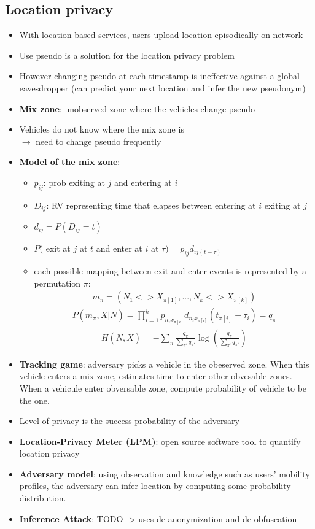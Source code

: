 \subsection{Location privacy}
\begin{itemize}
	\item With location-based services, users upload location episodically on network
	\item Use pseudo is a solution for the location privacy problem
	\item However changing pseudo at each timestamp is ineffective against a global eavesdropper (can predict your next location and infer the new pseudonym)
	\item \textbf{Mix zone}: unobserved zone where the vehicles change  pseudo 
	\item Vehicles do not know where the mix zone is \\
	$\rightarrow$ need to change pseudo frequently
	\item \textbf{Model of the mix zone}:
	\begin{itemize}
		\item $p_{ij}$: prob exiting at $j$ and entering at $i$
		\item $D_{ij}$: RV representing time that elapses between entering at $i$ exiting at $j$
		\item $d_{ij} = P(D_{ij} = t)$
		\item $P($ exit at $j$ at $t$ and enter at $i$ at $\tau) = p_{ij} d_{ij(t - \tau)}$
		\item each possible mapping between exit and enter events is represented by a permutation $\pi$:
		\begin{align*}
			m_{\pi} = (N_1 <> X_{\pi[1]}, ..., N_k <> X_{\pi[k]})
		\end{align*}
		\begin{align*}
			P(m_{\pi}, \bar{X} | \bar{N}) = \prod_{i=1}^k p_{n_i x_{\pi[i]}} d_{n_i x_{\pi[i]}} (t_{\pi[i]} - \tau_i) = q_{\pi}
		\end{align*}
		\begin{align*}
			H(\bar{N}, \bar{X}) = -\sum_{\pi} \frac{q_{\pi}}{\sum_{\pi'} q_{\pi'}} \log 
				\left( 
					\frac{q_{\pi}}{\sum_{\pi'} q_{\pi'}}
				\right)
		\end{align*}
	\end{itemize}
	\item \textbf{Tracking game}: adversary picks a vehicle in the obeserved zone. When this vehicle enters a mix zone, estimates time to enter other obvesable zones. When a vehicule enter obversable zone, compute probability of vehicle to be the one.
	\item Level of privacy is the success probability of the adversary
	\item \textbf{Location-Privacy Meter (LPM)}: open source software tool to quantify location privacy
	\item \textbf{Adversary model}: using observation and knowledge such as users' mobility profiles, the adversary can infer location by computing some probability distribution.
	\item \textbf{Inference Attack}: TODO -> uses de-anonymization and de-obfuscation
\end{itemize}
